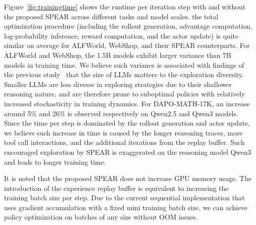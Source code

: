 \documentclass[]{youtu} %
\newcommand{\method}{\textsc{SPEAR}\xspace}
\begin{document}
Figure~\ref{fig:trainingtime} shows the runtime per iteration step with and without the proposed \method across different tasks and model scales.
the total optimization procedure (including the rollout generation, advantage computation, log-probability inference, reward computation, and the actor update) is quite similar on average for ALFWorld, WebShop, and their \method counterparts.
For ALFWorld and WebShop,
the 1.5B models exhibit larger variance than 7B models in training time.
We believe such variance is associated with findings of the previous study~\cite{havrilla2024teaching} that the size of LLMs matters to the exploration diversity.
Smaller LLMs are less diverse in exploring strategies due to their shallower reasoning nature,
and are therefore prone to suboptimal policies with relatively increased stochasticity in training dynamics.
For DAPO-MATH-17K,
an increase around 5\% and 26\% is observed respectively on Qwen2.5 and Qwen3 models.
Since the time per step is dominated by the rollout generation and actor update,
we believe such increase in time is caused by the longer reasoning traces, more tool call interactions, and the additional iterations from the replay buffer.
Such encouraged exploration by \method is exaggerated on the reasoning model Qwen3 and leads to longer training time.


{

It is noted that the proposed SPEAR does not increase GPU memory usage.
The introduction of the experience replay buffer is equivalent to increasing the training batch size per step.
Due to the current sequential implementation that uses gradient accumulation with a fixed mini training batch size,
we can achieve policy optimization on batches of any size without OOM issues.
}
\end{document}

